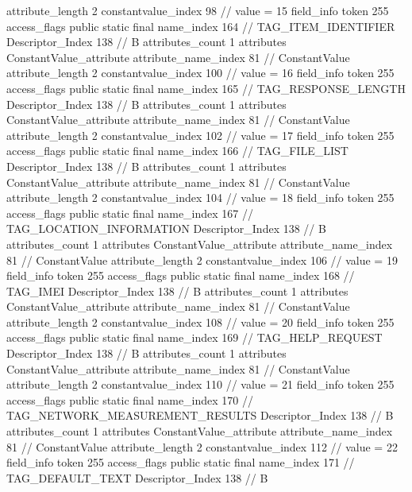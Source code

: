 {{{{{{{					attribute_length	2
					constantvalue_index	98		// value = 15
				}
				}
			}
			field_info {
				token	255
				access_flags	public static final
				name_index	164		// TAG_ITEM_IDENTIFIER
				Descriptor_Index	138		// B
				attributes_count	1
				attributes {
				ConstantValue_attribute {
					attribute_name_index	81		// ConstantValue
					attribute_length	2
					constantvalue_index	100		// value = 16
				}
				}
			}
			field_info {
				token	255
				access_flags	public static final
				name_index	165		// TAG_RESPONSE_LENGTH
				Descriptor_Index	138		// B
				attributes_count	1
				attributes {
				ConstantValue_attribute {
					attribute_name_index	81		// ConstantValue
					attribute_length	2
					constantvalue_index	102		// value = 17
				}
				}
			}
			field_info {
				token	255
				access_flags	public static final
				name_index	166		// TAG_FILE_LIST
				Descriptor_Index	138		// B
				attributes_count	1
				attributes {
				ConstantValue_attribute {
					attribute_name_index	81		// ConstantValue
					attribute_length	2
					constantvalue_index	104		// value = 18
				}
				}
			}
			field_info {
				token	255
				access_flags	public static final
				name_index	167		// TAG_LOCATION_INFORMATION
				Descriptor_Index	138		// B
				attributes_count	1
				attributes {
				ConstantValue_attribute {
					attribute_name_index	81		// ConstantValue
					attribute_length	2
					constantvalue_index	106		// value = 19
				}
				}
			}
			field_info {
				token	255
				access_flags	public static final
				name_index	168		// TAG_IMEI
				Descriptor_Index	138		// B
				attributes_count	1
				attributes {
				ConstantValue_attribute {
					attribute_name_index	81		// ConstantValue
					attribute_length	2
					constantvalue_index	108		// value = 20
				}
				}
			}
			field_info {
				token	255
				access_flags	public static final
				name_index	169		// TAG_HELP_REQUEST
				Descriptor_Index	138		// B
				attributes_count	1
				attributes {
				ConstantValue_attribute {
					attribute_name_index	81		// ConstantValue
					attribute_length	2
					constantvalue_index	110		// value = 21
				}
				}
			}
			field_info {
				token	255
				access_flags	public static final
				name_index	170		// TAG_NETWORK_MEASUREMENT_RESULTS
				Descriptor_Index	138		// B
				attributes_count	1
				attributes {
				ConstantValue_attribute {
					attribute_name_index	81		// ConstantValue
					attribute_length	2
					constantvalue_index	112		// value = 22
				}
				}
			}
			field_info {
				token	255
				access_flags	public static final
				name_index	171		// TAG_DEFAULT_TEXT
				Descriptor_Index	138		// B
}}}}}
